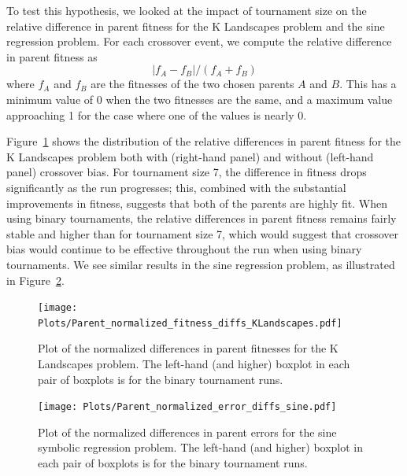 \documentclass{sig-alternate}
\begin{document}

To test this hypothesis, we looked at the impact of tournament size on the relative difference in parent fitness for
the K Landscapes problem and the sine regression problem. For each crossover event, we compute the relative difference
in parent fitness as
\[
	|f_A - f_B| / (f_A + f_B)
\]
where $f_A$ and $f_B$ are the fitnesses of the two chosen parents $A$ and $B$. This has a minimum value of 0 when the two
fitnesses are the same, and a maximum value approaching 1 for the case where one of the values is nearly 0.

Figure~\ref{fig:parentDiffsKLandscapes} shows the distribution of the relative differences in parent fitness for the K
Landscapes problem both with (right-hand panel) and without (left-hand panel) crossover bias. 
For tournament size 7, the difference in fitness drops
significantly as the run progresses; this, combined with the substantial improvements in fitness, suggests that 
both of the parents are highly fit. When using binary
tournaments, the relative differences in parent fitness remains fairly stable and higher than for tournament size 7, 
which would suggest that
crossover bias would continue to be effective throughout the run when using binary tournaments. We see similar results
in the sine regression problem, as illustrated in Figure~\ref{fig:parentDiffsSine}.

\begin{figure}[tb]
\centering
\texttt{[image: Plots/Parent\_normalized\_fitness\_diffs\_KLandscapes.pdf]}
\caption{Plot of the normalized differences in parent fitnesses for the K Landscapes problem. The left-hand (and higher) boxplot in each pair of boxplots is for the binary tournament runs.}
\label{fig:parentDiffsKLandscapes}
\end{figure}

\begin{figure}[tb]
	\centering
	\texttt{[image: Plots/Parent\_normalized\_error\_diffs\_sine.pdf]}
	\caption{Plot of the normalized differences in parent errors for the sine symbolic regression problem.  The left-hand (and higher) boxplot in each pair of boxplots is for the binary tournament runs.}
	\label{fig:parentDiffsSine}
\end{figure}
\end{document}
